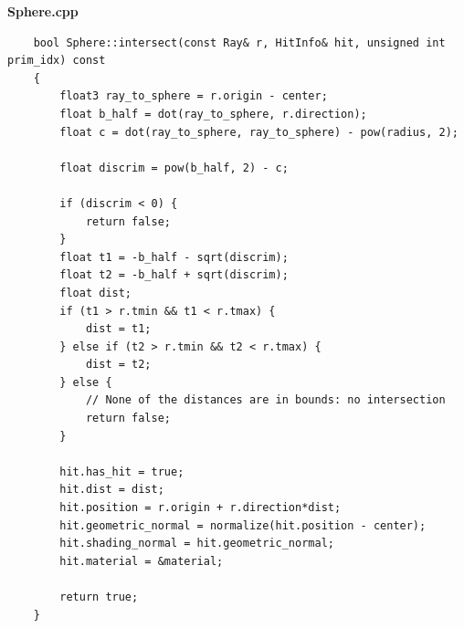 \documentclass[a4,12pt]{article}
\begin{document}
	\textbf{Sphere.cpp}
	\begin{lstlisting}
	bool Sphere::intersect(const Ray& r, HitInfo& hit, unsigned int prim_idx) const
	{
		float3 ray_to_sphere = r.origin - center;
		float b_half = dot(ray_to_sphere, r.direction);
		float c = dot(ray_to_sphere, ray_to_sphere) - pow(radius, 2);
		
		float discrim = pow(b_half, 2) - c;
		
		if (discrim < 0) {
			return false;
		}
		float t1 = -b_half - sqrt(discrim);
		float t2 = -b_half + sqrt(discrim);
		float dist;
		if (t1 > r.tmin && t1 < r.tmax) {
			dist = t1;
		} else if (t2 > r.tmin && t2 < r.tmax) {
			dist = t2;
		} else {
			// None of the distances are in bounds: no intersection
			return false;
		}
		
		hit.has_hit = true;
		hit.dist = dist;
		hit.position = r.origin + r.direction*dist;
		hit.geometric_normal = normalize(hit.position - center);
		hit.shading_normal = hit.geometric_normal;
		hit.material = &material;
		
		return true;
	}
	\end{lstlisting}
\end{document}
